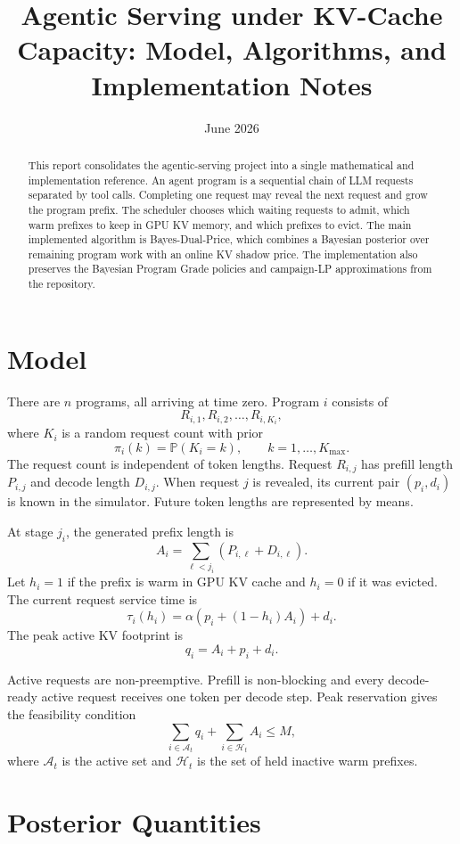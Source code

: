 \documentclass[11pt]{article}
\title{Agentic Serving under KV-Cache Capacity: Model, Algorithms, and Implementation Notes}
\author{}
\date{June 2026}
\newcommand{\Prb}{\mathbb P}
\begin{document}
\maketitle

\begin{abstract}
This report consolidates the agentic-serving project into a single mathematical
and implementation reference.  An agent program is a sequential chain of LLM
requests separated by tool calls.  Completing one request may reveal the next
request and grow the program prefix.  The scheduler chooses which waiting
requests to admit, which warm prefixes to keep in GPU KV memory, and which
prefixes to evict.  The main implemented algorithm is Bayes-Dual-Price, which
combines a Bayesian posterior over remaining program work with an online KV
shadow price.  The implementation also preserves the Bayesian Program Grade
policies and campaign-LP approximations from the repository.
\end{abstract}

\section{Model}

There are $n$ programs, all arriving at time zero.  Program $i$ consists of
\[
    R_{i,1},R_{i,2},\ldots,R_{i,K_i},
\]
where $K_i$ is a random request count with prior
\[
    \pi_i(k)=\Prb(K_i=k), \qquad k=1,\ldots,K_{\max}.
\]
The request count is independent of token lengths.  Request $R_{i,j}$ has
prefill length $P_{i,j}$ and decode length $D_{i,j}$.  When request $j$ is
revealed, its current pair $(p_i,d_i)$ is known in the simulator.  Future token
lengths are represented by means.

At stage $j_i$, the generated prefix length is
\[
    A_i=\sum_{\ell<j_i}(P_{i,\ell}+D_{i,\ell}).
\]
Let $h_i=1$ if the prefix is warm in GPU KV cache and $h_i=0$ if it was evicted.
The current request service time is
\[
    \tau_i(h_i)=\alpha\left(p_i+(1-h_i)A_i\right)+d_i.
\]
The peak active KV footprint is
\[
    q_i=A_i+p_i+d_i.
\]

Active requests are non-preemptive.  Prefill is non-blocking and every
decode-ready active request receives one token per decode step.  Peak
reservation gives the feasibility condition
\[
    \sum_{i\in\mathcal A_t} q_i+\sum_{i\in\mathcal H_t} A_i\le M,
\]
where $\mathcal A_t$ is the active set and $\mathcal H_t$ is the set of held
inactive warm prefixes.

\section{Posterior Quantities}
\end{document}
